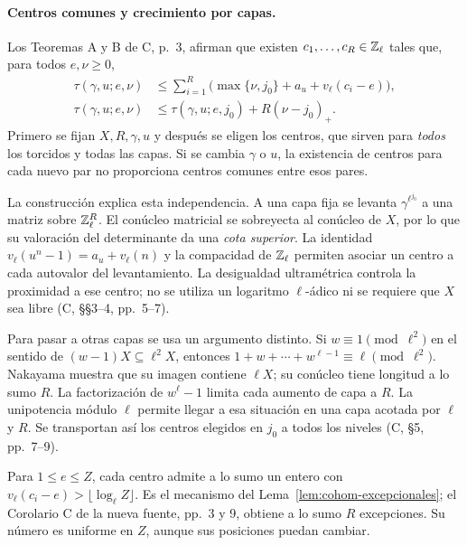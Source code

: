 \paragraph{Centros comunes y crecimiento por capas.}
Los Teoremas A y B de C, p.~3, afirman que existen
$c_1,\ldots,c_R\in\mathbb{Z}_\ell$ tales que, para todos $e,\nu\ge0$,
\[
 \begin{aligned}
 \tau(\gamma,u;e,\nu)
 &\le\sum_{i=1}^R
       \bigl(\max\{\nu,j_0\}+a_u+v_\ell(c_i-e)\bigr),\\
 \tau(\gamma,u;e,\nu)
 &\le\tau(\gamma,u;e,j_0)+R(\nu-j_0)_+.
 \end{aligned}
\]
Primero se fijan $X,R,\gamma,u$ y después se eligen los centros,
que sirven para \emph{todos} los torcidos y todas las capas.
Si se cambia $\gamma$ o $u$, la existencia de centros para cada
nuevo par no proporciona centros comunes entre esos pares.

La construcción explica esta independencia. A una capa fija se
levanta $\gamma^{\ell^{j_0}}$ a una matriz sobre $\mathbb{Z}_\ell^R$.
El conúcleo matricial se sobreyecta al conúcleo de $X$, por lo que
su valoración del determinante da una \emph{cota superior}.
La identidad
$v_\ell(u^n-1)=a_u+v_\ell(n)$ y la compacidad de $\mathbb{Z}_\ell$
permiten asociar un centro a cada autovalor del levantamiento.
La desigualdad ultramétrica controla la proximidad a ese centro;
no se utiliza un logaritmo $\ell$-ádico ni se requiere que $X$
sea libre (C, §§3--4, pp.~5--7).

Para pasar a otras capas se usa un argumento distinto.
Si $w\equiv1\pmod{\ell^2}$ en el sentido de
$(w-1)X\subseteq\ell^2X$, entonces
$1+w+\cdots+w^{\ell-1}\equiv\ell\pmod{\ell^2}$.
Nakayama muestra que su imagen contiene $\ell X$; su conúcleo
tiene longitud a lo sumo $R$.
La factorización de $w^\ell-1$ limita cada aumento de capa a $R$.
La unipotencia módulo $\ell$ permite llegar a esa situación
en una capa acotada por $\ell$ y $R$.
Se transportan así los centros elegidos en $j_0$ a todos los niveles
(C, §5, pp.~7--9).

Para $1\le e\le Z$, cada centro admite a lo sumo un entero
con $v_\ell(c_i-e)>\lfloor\log_\ell Z\rfloor$.
Es el mecanismo del Lema~\ref{lem:cohom-excepcionales};
el Corolario C de la nueva fuente, pp.~3 y 9, obtiene
a lo sumo $R$ excepciones.
Su número es uniforme en $Z$, aunque sus posiciones puedan cambiar.

